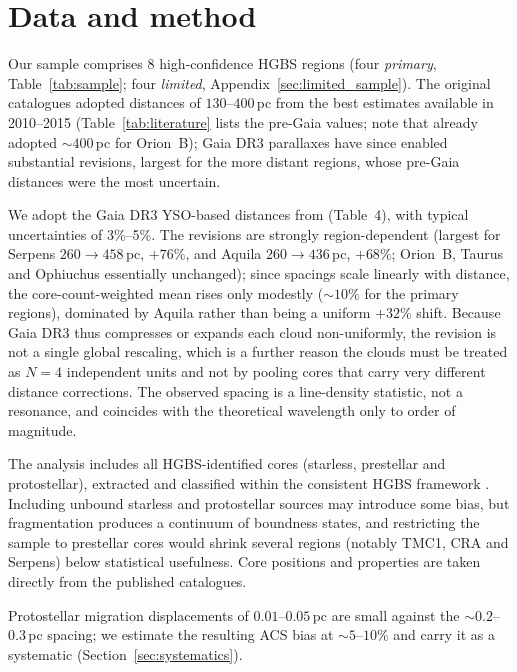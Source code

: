 \documentclass[usenatbib,twoside,twocolumn]{mnras}
\begin{document}
\section{Data and method}
\label{sec:data}

Our sample comprises 8 high-confidence HGBS regions (four \emph{primary}, Table~\ref{tab:sample}; four \emph{limited}, Appendix~\ref{sec:limited_sample}). The original catalogues \citep{Konyves2015, Konyves2020, Ladjelate2020, Pezzuto2021} adopted distances of $130$--$400$\,pc from the best estimates available in 2010--2015 (Table~\ref{tab:literature} lists the pre-Gaia values; note that \citealt{Konyves2020} already adopted $\sim400$\,pc for Orion~B); Gaia DR3 parallaxes \citep{Zhang2023} have since enabled substantial revisions, largest for the more distant regions, whose pre-Gaia distances were the most uncertain.

We adopt the Gaia DR3 YSO-based distances from \citet{Zhang2023} (Table~4), with typical uncertainties of 3\%--5\%. The revisions are strongly region-dependent (largest for Serpens $260\to458$\,pc, $+76\%$, and Aquila $260\to436$\,pc, $+68\%$; Orion~B, Taurus and Ophiuchus essentially unchanged); since spacings scale linearly with distance, the core-count-weighted mean rises only modestly ($\sim10\%$ for the primary regions), dominated by Aquila rather than being a uniform $+32\%$ shift. Because Gaia DR3 thus compresses or expands each cloud non-uniformly, the revision is not a single global rescaling, which is a further reason the clouds must be treated as $N=4$ independent units and not by pooling cores that carry very different distance corrections. The observed spacing is a line-density statistic, not a resonance, and coincides with the theoretical wavelength only to order of magnitude.

The analysis includes all HGBS-identified cores (starless, prestellar and protostellar), extracted and classified within the consistent HGBS framework \citep{Konyves2015, Konyves2020}. Including unbound starless and protostellar sources may introduce some bias, but fragmentation produces a continuum of boundness states, and restricting the sample to prestellar cores would shrink several regions (notably TMC1, CRA and Serpens) below statistical usefulness. Core positions and properties are taken directly from the published catalogues.

Protostellar migration displacements of $0.01$--$0.05$\,pc \citep{Kirk2016, Mattern2018} are small against the $\sim0.2$--$0.3$\,pc spacing; we estimate the resulting ACS bias at $\sim5$--$10\%$ and carry it as a systematic (Section~\ref{sec:systematics}).
\end{document}
